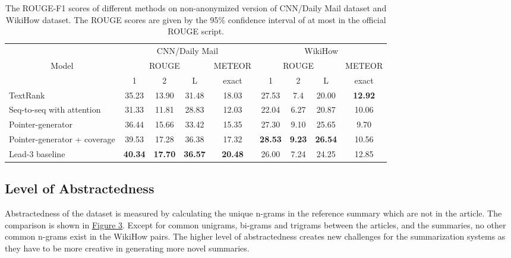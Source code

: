 \documentclass[11pt,a4paper]{article}
\begin{document}
\begin{table*}
\footnotesize
\label{results}
\centering
\begin{tabular}{|l|c|c|c|c|c|c|c|c|}
\hline
&\multicolumn{4}{|c|}{CNN/Daily Mail}&\multicolumn{4}{|c|}{WikiHow}\\
\cline{2-9}
\multicolumn{1}{|c|}{Model}&\multicolumn{3}{|c|}{ROUGE}&\multicolumn{1}{|c|}{METEOR}&\multicolumn{3}{|c|}{ROUGE}&\multicolumn{1}{|c|}{METEOR}\\
\cline{2-9}
&1&2&L&exact&1&2&L&exact\\
\hline
{TextRank} &35.23&13.90&31.48&18.03&27.53&7.4&20.00&\textbf{12.92}\\
{Seq-to-seq with attention} &31.33&11.81&28.83&12.03&22.04&6.27&20.87&10.06\\
{Pointer-generator} &36.44&15.66&33.42&15.35&27.30&9.10&25.65&9.70\\
{Pointer-generator + coverage} &39.53&17.28&36.38&17.32&\textbf{28.53}&\textbf{9.23}&\textbf{26.54}&10.56\\
\hline
{Lead-3 baseline} &\textbf{40.34}&\textbf{17.70}&\textbf{36.57}&\textbf{20.48}&26.00&7.24 &24.25&12.85\\
\hline
\end{tabular}
\caption{The ROUGE-F1 scores of different methods on non-anonymized version of CNN/Daily Mail dataset and WikiHow dataset. The ROUGE scores are given by the 95\% confidence interval of at most  in the official ROUGE script.}
\end{table*}

\subsection{Level of Abstractedness}
Abstractedness of the dataset is measured by calculating the unique n-grams in the reference summary which are not in the article. 
The comparison is shown in \hyperref[fig:abstract]{Figure 3}. Except for common unigrams, bi-grams and trigrams between the articles, and the summaries, no other common n-grams exist in the WikiHow pairs. The higher level of abstractedness creates new challenges for the summarization systems as they have to be more creative in generating more novel summaries.
\end{document}
